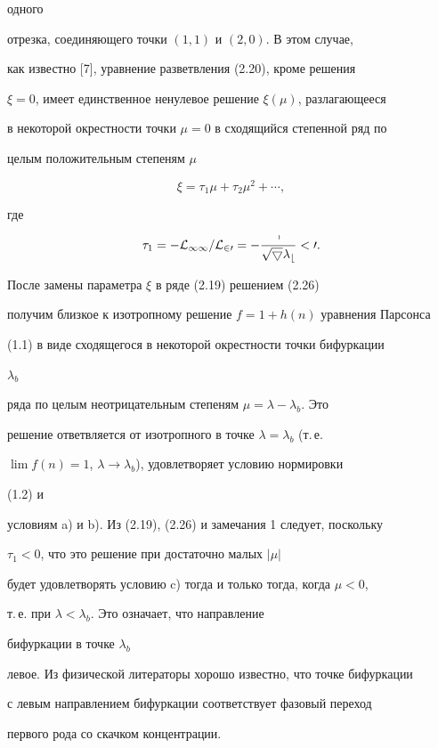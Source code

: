 одного 


отрезка, соединяющего точки $(1,1)$ и $(2,0)$. В этом случае,  


как известно [7], уравнение разветвления (2.20), кроме решения  


$\xi=0$, имеет единственное ненулевое решение $\xi(\mu)$, разлагающееся 


в некоторой окрестности точки $\mu=0$ в сходящийся степенной ряд по 


целым положительным степеням $\mu$ 


\begin{equation} 


\xi=\tau_1\mu+\tau_2\mu^2+\dotsb,\tag{2.26} 


\end{equation} 


где 


$$ 


\tau_1=-\cal L_{11}/\cal L_{20}=-\frac{7}{\sqrt{5}\lambda_b}<0. 


$$ 


После замены параметра $\xi$ в ряде (2.19) решением (2.26) 


получим близкое к изотропному решение $f=1+h(n)$ уравнения Парсонса 


(1.1) в виде сходящегося в некоторой окрестности точки бифуркации 


$\lambda_b$ 


ряда по целым неотрицательным степеням $\mu=\lambda-\lambda_b$. Это  


решение ответвляется от изотропного в точке $\lambda=\lambda_b$ (т.\,е. 


$\lim f(n)=1$, $\lambda\to\lambda_b$), удовлетворяет условию нормировки 


(1.2) и 


условиям a) и b). Из (2.19), (2.26) и замечания 1 следует, поскольку 


$\tau_1<0$, что это решение при достаточно малых $|\mu|$ 


будет удовлетворять условию c) тогда и только тогда, когда $\mu<0$, 


т.\,е. при $\lambda<\lambda_b$. Это означает, что направление 


бифуркации в точке $\lambda_b$ 


левое. Из физической литераторы хорошо известно, что точке бифуркации 


с левым направлением бифуркации соответствует фазовый переход 


первого рода со скачком концентрации. 


